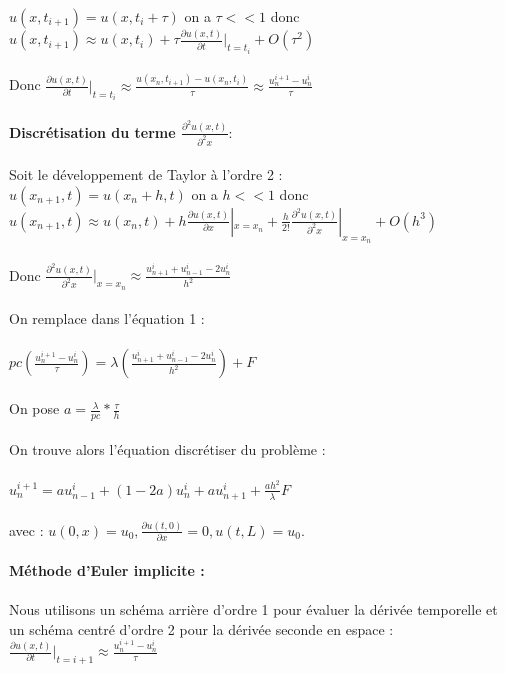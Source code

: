 \documentclass[french]{report}
\begin{document}
$u(x,t_{i+1})=u(x,t_{i}+\tau)$ on a $\tau << 1$ donc 
$u(x,t_{i+1}) \approx u(x,t_{i}) +\tau \frac{\partial u(x,t)}{\partial t}|_{t=t_i} + O(\tau^2) $\\\\
Donc 
$\frac{\partial u(x,t)}{\partial t}|_{t=t_i} \approx \frac{u(x_n,t_{i+1})-u(x_n,t_{i})}{\tau} \approx \frac{u_n^{i+1}-u_n^{i}}{\tau}$\\\\
\textbf{Discrétisation du terme $\frac{\partial^2 u(x,t)}{\partial^2 x}$}:\\\\
Soit le développement de Taylor à l'ordre 2 :\\
$u(x_{n+1},t)=u(x_{n}+h,t)$ on a $h << 1$ donc 
$u(x_{n+1},t) \approx u(x_{n},t) +h \frac{\partial u(x,t)}{\partial x}|_{x=x_n}+\frac{h}{2!}\frac{\partial^2 u(x,t)}{\partial^2 x}|_{x=x_n} + O(h^3) $\\\\
Donc 
$\frac{\partial^2 u(x,t)}{\partial^2 x}|_{x=x_n} \approx \frac{u_{n+1}^{i}+u_{n-1}^{i} -2u_{n}^{i} }{h^2}$\\\\
On remplace dans l'équation 1 :\\\\
$pc (\frac{u_n^{i+1}-u_n^{i}}{\tau}) = \lambda(\frac{u_{n+1}^{i}+u_{n-1}^{i} -2u_{n}^{i} }{h^2}) +F$\\\\
On pose $a=\frac{\lambda}{pc} *\frac{\tau}{h}$ \\\\
On trouve alors l'équation discrétiser du problème : \\\\
$u_n^{i+1} =  a u_{n-1}^{i} + (1-2a)u_{n}^{i} +au_{n+1}^{i} +\frac{ah^2}{\lambda}F $\\\\
avec :\bigbreak
$ u(0,x) = u_0 ,
\frac{\partial u(t,0)}{\partial x} = 0, 
u(t,L)=u_0.$\\\\
\textbf{Méthode d'Euler implicite :}\\\\
Nous utilisons un schéma arrière d'ordre 1 pour évaluer la dérivée temporelle et un schéma centré
d'ordre 2 pour la dérivée seconde en espace :\\

$\frac{\partial u(x,t)}{\partial t}|_{t=i+1} \approx \frac{u_{n}^{i+1}-u_n^{i}}{\tau}$\\
\end{document}
